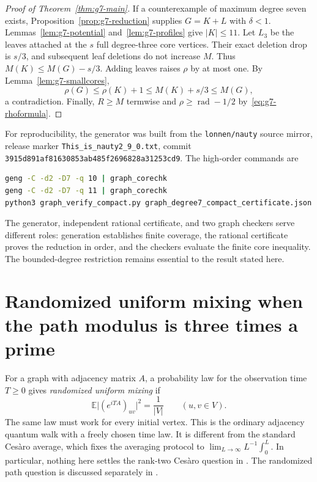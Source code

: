 \documentclass[11pt,a4paper]{article}
\theoremstyle{definition}\newtheorem{definition}[theorem]{Definition}
\theoremstyle{remark}\newtheorem{remark}[theorem]{Remark}
\begin{document}
\begin{proof}[Proof of Theorem~\ref{thm:g7-main}]
If a counterexample of maximum degree seven exists,
Proposition~\ref{prop:g7-reduction} supplies $G=K+L$ with $\delta<1$.
Lemmas~\ref{lem:g7-potential} and~\ref{lem:g7-profiles} give $|K|\le11$.
Let $L_3$ be the leaves attached at the $s$ full degree-three core
vertices. Their exact deletion drop is $s/3$, and subsequent leaf
deletions do not increase $M$. Thus $M(K)\le M(G)-s/3$.
Adding leaves raises $\rho$ by at most one. By
Lemma~\ref{lem:g7-smallcores},
\[
 \rho(G)\le\rho(K)+1\le M(K)+s/3\le M(G),
\]
a contradiction. Finally, $R\ge M$ termwise and
$\rho\ge\operatorname{rad}-1/2$ by~\eqref{eq:g7-rhoformula}.
\end{proof}

For reproducibility, the generator was built from the
\texttt{lonnen/nauty} source mirror, release marker
\texttt{This\_is\_nauty2\_9\_0.txt}, commit
\texttt{3915d891af81630853ab485f2696828a31253cd9}.
The high-order commands are
\begin{lstlisting}[language=bash,basicstyle=\ttfamily\footnotesize,breaklines=true]
geng -C -d2 -D7 -q 10 | graph_corechk
geng -C -d2 -D7 -q 11 | graph_corechk
python3 graph_verify_compact.py graph_degree7_compact_certificate.json
\end{lstlisting}
The generator, independent rational certificate, and two graph checkers
serve different roles: generation establishes finite coverage,
the rational certificate proves the reduction in order, and the
checkers evaluate the finite core inequality. The bounded-degree
restriction remains essential to the result stated here.


\section{Randomized uniform mixing when the path modulus is three times a prime}
\label{sec:three-prime-paths}

For a graph with adjacency matrix $A$, a probability law for the observation
time $T\geq0$ gives \emph{randomized uniform mixing} if
\[
 \mathbb E\bigl|(e^{iTA})_{uv}\bigr|^2=\frac1{|V|}
 \qquad(u,v\in V).
\]
The same law must work for every initial vertex. This is the ordinary
adjacency quantum walk with a freely chosen time law. It is different from
the standard Ces\`aro average, which fixes the averaging protocol to
$\lim_{L\to\infty}L^{-1}\int_0^L$. In particular, nothing here settles
the rank-two Ces\`aro question in \cite[Open Problem~4.1]{CoutinhoGuo2024}.
The randomized path question is discussed separately in
\cite[Section~4.2]{CoutinhoGuo2024}.
\end{document}
